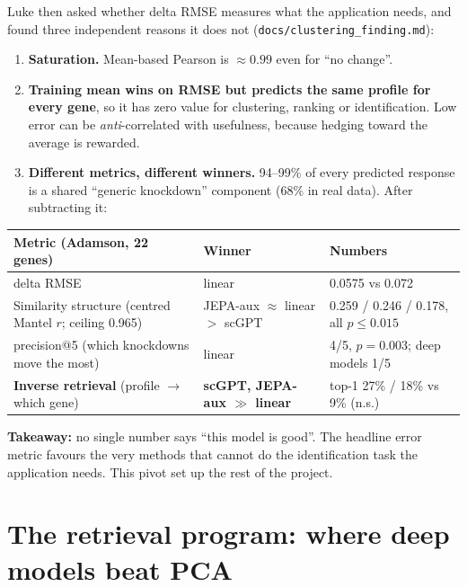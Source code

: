 \documentclass[11pt]{article}
\newcommand{\code}[1]{\texttt{\small #1}}
\begin{document}
Luke then asked whether delta RMSE measures what the application needs, and found three independent reasons it does not (\code{docs/clustering\_finding.md}):
\begin{enumerate}
\item \textbf{Saturation.} Mean-based Pearson is $\approx 0.99$ even for ``no change''.
\item \textbf{Training mean wins on RMSE but predicts the same profile for every gene}, so it has zero value for clustering, ranking or identification. Low error can be \emph{anti}-correlated with usefulness, because hedging toward the average is rewarded.
\item \textbf{Different metrics, different winners.} 94--99\% of every predicted response is a shared ``generic knockdown'' component (68\% in real data). After subtracting it:
\end{enumerate}
\begin{center}\small
\begin{tabular}{lll}
\toprule
Metric (Adamson, 22 genes) & Winner & Numbers\\
\midrule
delta RMSE & linear & 0.0575 vs 0.072\\
Similarity structure (centred Mantel $r$; ceiling 0.965) & JEPA-aux $\approx$ linear $>$ scGPT & 0.259 / 0.246 / 0.178, all $p\le 0.015$\\
precision@5 (which knockdowns move the most) & linear & 4/5, $p=0.003$; deep models 1/5\\
\textbf{Inverse retrieval} (profile $\to$ which gene) & \textbf{scGPT, JEPA-aux $\gg$ linear} & top-1 27\% / 18\% vs 9\% (n.s.)\\
\bottomrule
\end{tabular}
\end{center}
\textbf{Takeaway:} no single number says ``this model is good''. The headline error metric favours the very methods that cannot do the identification task the application needs. This pivot set up the rest of the project.

\section{The retrieval program: where deep models beat PCA}
\end{document}
